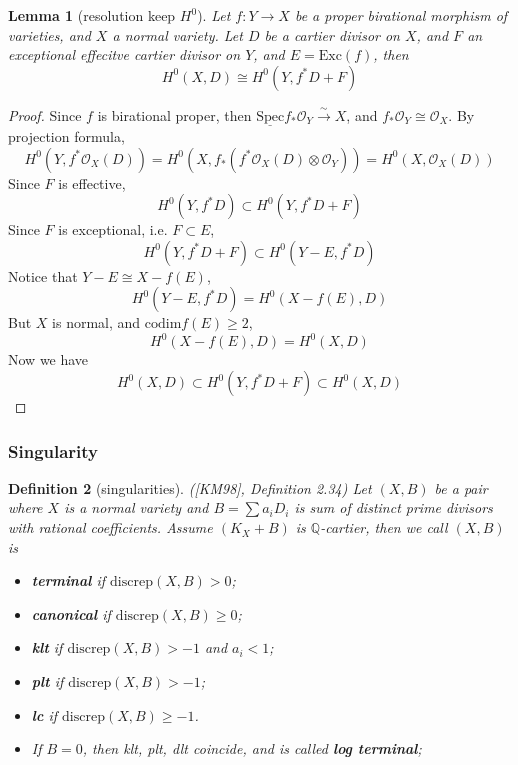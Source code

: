 \documentclass{article}
\newtheorem{defn}{Definition}[section]
\newtheorem{lem}[defn]{Lemma}
\begin{document}
\begin{lem}[resolution keep $H^0$]
  Let $ f:Y\to X $ be a proper birational morphism of varieties, and $ X $ a normal variety. Let $ D $ be a cartier divisor on $ X $, and $ F $ an exceptional effecitve cartier divisor on $ Y $, and $ E=\mathrm{Exc}(f) $, then 
  \[ H^0(X,D)\cong H^0(Y,f^*D+F) \] 
\end{lem}
\begin{proof}
  Since $ f $ is birational proper, then $  \underline{\mathrm{Spec}}f_*\mathcal{O}_Y\xrightarrow{\sim}X $, and $ f_*\mathcal{O}_Y\cong \mathcal{O}_X $. By projection formula, 
  \[ H^0(Y,f^*\mathcal{O}_X(D))=H^0\left(X,f_*\left(f^*\mathcal{O}_X(D)\otimes \mathcal{O}_Y\right)\right)=H^0(X,\mathcal{O}_X(D))\]
  Since $ F $ is effective,
  \[ H^0(Y,f^*D)\subset H^0(Y,f^*D+F) \]
  Since $ F $ is exceptional, i.e. $ F\subset E $,
  \[ H^0(Y,f^*D+F)\subset H^0(Y-E,f^*D) \]
  Notice that $ Y-E\cong X-f(E)  $,
  \[ H^0(Y-E,f^*D)= H^0(X-f(E),D) \]
  But $ X $ is normal, and $ \mathrm{codim} f(E)\geqslant 2 $,
  \[  H^0(X-f(E),D) =H^0(X,D) \]
  Now we have 
  \[ H^0(X,D) \subset H^0(Y,f^*D+F)\subset H^0(X,D) \]
\end{proof}

\subsubsection{Singularity}

\begin{defn}[singularities]
  ([KM98], Definition 2.34) Let $ (X,B) $ be a pair where $ X $ is a normal variety and $ B=\sum a_iD_i $ is sum of distinct prime divisors with rational coefficients. Assume $ (K_X+B) $ is $ \mathbb{Q} $-cartier, then we call $ (X,B) $ is 
  \begin{itemize}
    \item \textbf{terminal} if $ \mathrm{discrep}(X,B) >0$;
    \item \textbf{canonical} if $ \mathrm{discrep}(X,B) \geqslant 0$;
    \item \textbf{klt} if $ \mathrm{discrep}(X,B) >-1$ and $ a_i<1 $;
    \item \textbf{plt} if $ \mathrm{discrep}(X,B) >-1$;
    \item \textbf{lc} if $ \mathrm{discrep}(X,B) \geqslant -1 $. 
    \item If $ B=0 $, then klt, plt, dlt coincide, and is called \textbf{log terminal};
  \end{itemize}
\end{defn}
\end{document}

